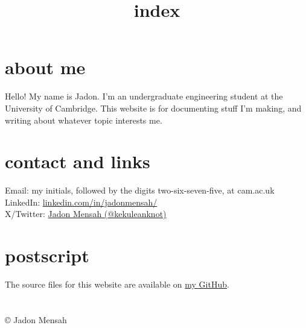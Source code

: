 \documentclass{article}
\begin{document}
	\title{index}
	\date{}
	\maketitle
	\section{about me}
	Hello! My name is Jadon. I'm an undergraduate engineering student at the University of Cambridge. This website is for documenting stuff I'm making, and writing about whatever topic interests me.
	\section{contact and links}
	Email: my initials, followed by the digits two-six-seven-five, at cam.ac.uk\\
	LinkedIn: \href{https://www.linkedin.com/in/jadonmensah/}{linkedin.com/in/jadonmensah/}\\
	X/Twitter: \href{https://x.com/kekuleanknot}{Jadon Mensah (@kekuleanknot)} 
	\section{postscript}
	The source files for this website are available on \href{https://github.com/jadonmensah/jadonm.com/}{my GitHub}.
	\section{}
	\copyright{} Jadon Mensah
	
\end{document}
